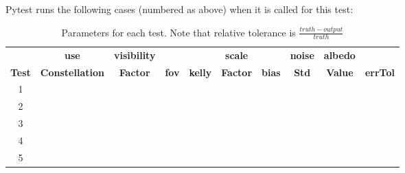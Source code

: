 Pytest runs the following cases (numbered as above) when it is called for this test:
	\begin{table}[htbp]
	\caption{Parameters for each test. Note that relative tolerance is $\frac{truth - output}{truth}$}
	\label{tab:errortol}
	\centering \fontsize{10}{10}\selectfont
	\begin{tabular}{ c | c | c | c | c | c | c | c | c | c } %
		\hline\hline
		\textbf{}& \textbf{use}& \textbf{visibility}& \textbf{}& \textbf{}& \textbf{scale}& \textbf{}& \textbf{noise}& \textbf{albedo}& \textbf{}\\ 
		\textbf{Test}& \textbf{Constellation}& \textbf{Factor}& \textbf{fov}& \textbf{kelly}& \textbf{Factor}& \textbf{bias}& \textbf{Std}& \textbf{Value}& \textbf{errTol}\\ 
		\hline\hline
		1      & &&&&&&&&	   \\ \hline
		2	& &&&&&&&&	   \\ \hline
		3	& &&&&&&&&	   \\ \hline
		4      & &&&&&&&&	   \\ \hline
		5	& &&&&&&&&	   \\ \hline

\end{tabular}
\end{table}

